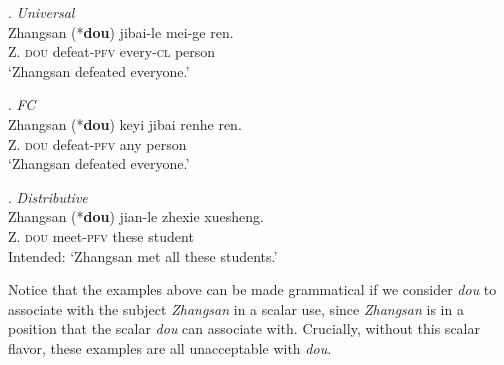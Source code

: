 \documentclass[12pt]{article}
\begin{document}
\ex. \emph{Universal}\\
\gll
Zhangsan (*\textbf{dou}) jibai-le mei-ge ren. \\
Z. \phantom{(*}\textsc{dou} defeat-\textsc{pfv}  every-\textsc{cl} person\\
\glt `Zhangsan defeated everyone.'

\ex. \emph{FC}\\
\gll
Zhangsan (*\textbf{dou}) keyi jibai renhe ren. \\
Z. \phantom{(*}\textsc{dou} defeat-\textsc{pfv}  any person\\
\glt `Zhangsan defeated everyone.'

\ex. \emph{Distributive}\\
\gll
Zhangsan (*\textbf{dou}) jian-le zhexie xuesheng. \\
Z. \phantom{(*}\textsc{dou} meet-\textsc{pfv} these student\\
\glt Intended: `Zhangsan met all these students.'

Notice that the examples above can be made grammatical if we consider \emph{dou} to associate with the subject \emph{Zhangsan} in a scalar use, since \emph{Zhangsan} is in a position that the scalar \emph{dou} can associate with.
Crucially, without this scalar flavor, these examples are all unacceptable with \emph{dou}.
\end{document}
